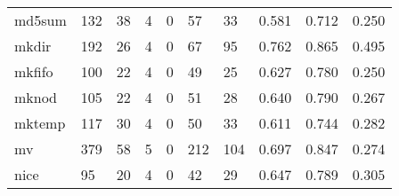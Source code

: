 \begin{longtable}{lp{2.0cm}p{2.0cm}p{2.0cm}p{2.0cm}p{2.0cm}p{2.0cm}p{2.0cm}p{2.0cm}p{2.0cm}}
md5sum    &                    132 &                                 38 &                                 4 &                                0 &                                57 &                              33 &                                0.581 &                                  0.712 &                                0.250 \\
mkdir     &                    192 &                                 26 &                                 4 &                                0 &                                67 &                              95 &                                0.762 &                                  0.865 &                                0.495 \\
mkfifo    &                    100 &                                 22 &                                 4 &                                0 &                                49 &                              25 &                                0.627 &                                  0.780 &                                0.250 \\
mknod     &                    105 &                                 22 &                                 4 &                                0 &                                51 &                              28 &                                0.640 &                                  0.790 &                                0.267 \\
mktemp    &                    117 &                                 30 &                                 4 &                                0 &                                50 &                              33 &                                0.611 &                                  0.744 &                                0.282 \\
mv        &                    379 &                                 58 &                                 5 &                                0 &                               212 &                             104 &                                0.697 &                                  0.847 &                                0.274 \\
nice      &                     95 &                                 20 &                                 4 &                                0 &                                42 &                              29 &                                0.647 &                                  0.789 &                                0.305 \\

\end{longtable}

